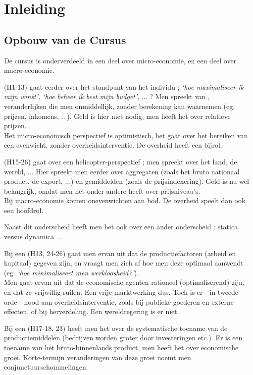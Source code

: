 \section{Inleiding}

\subsection{Opbouw van de Cursus}

De cursus is onderverdeeld in een deel over micro-economie, en een deel over macro-economie.

\begin{leftbar}
\par{} (H1-13) gaat eerder over het standpunt van het individu ; \textit{`hoe maximaliseer ik mijn winst', `hoe beheer ik best mijn budget'}, ... ? Men spreekt van , veranderlijken die men onmiddellijk, zonder berekening kan waarnemen (eg. prijzen, inkomens, ...). Geld is hier niet nodig, men heeft het over relatieve prijzen. \\
Het micro-economisch perspectief is optimistisch, het gaat over het bereiken van een evenwicht, zonder overheidsinterventie. De overheid heeft een bijrol. \\
\par{} (H15-26) gaat over een helicopter-perspectief ; men spreekt over het land, de wereld, ... Hier spreekt men eerder over aggregaten (zoals het bruto nationaal product, de export, ...) en gemiddelden (zoals de prijsindexering). Geld is nu wel belangrijk, omdat men het onder andere heeft over prijsniveau's. \\
Bij macro-economie komen onevenwichten aan bod. De overheid speelt dan ook een hoofdrol.\\
\end{leftbar}

\par\noindent Naast dit onderscheid heeft men het ook over een ander onderscheid : statica versus dynamica ...

\begin{leftbar}
\par Bij een  (H13, 24-26) gaat men ervan uit dat de productiefactoren (arbeid en kapitaal) gegeven zijn, en vraagt men zich af hoe men deze optimaal aanwendt (eg. \textit{`hoe minimaliseert men werkloosheid?'}).\\
Men gaat ervan uit dat de economische agenten rationeel (optimaliserend) zijn, en dat ze vrijwillig ruilen. Een vrije marktwerking dus. Toch is er - in tweede orde - nood aan overheidsinterventie, zoals bij publieke goederen en externe effecten, of bij herverdeling. Een wereldregering is er niet.\\
\par Bij een  (H17-18, 23) heeft men het over de systematische toename van de productiemiddelen (bedrijven worden groter door investeringen etc.). Er is een toename van het bruto-binnenlands product, men heeft het over economische groei. Korte-termijn veranderingen van deze groei noemt men conjunctuurschommelingen.
\end{leftbar}

